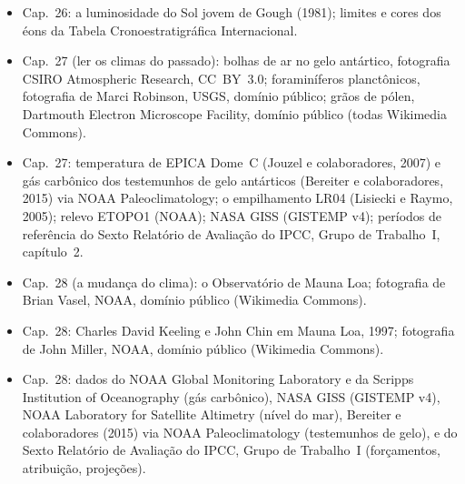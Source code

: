 \begin{itemize}
  \item Cap.~26: a luminosidade do Sol jovem de Gough (1981); limites e cores dos éons da Tabela Cronoestratigráfica Internacional.
  \item Cap.~27 (ler os climas do passado): bolhas de ar no gelo antártico, fotografia CSIRO Atmospheric Research, CC~BY~3.0; foraminíferos planctônicos, fotografia de Marci Robinson, USGS, domínio público; grãos de pólen, Dartmouth Electron Microscope Facility, domínio público (todas Wikimedia Commons).
  \item Cap.~27: temperatura de EPICA Dome~C (Jouzel e colaboradores, 2007) e gás carbônico dos testemunhos de gelo antárticos (Bereiter e colaboradores, 2015) via NOAA Paleoclimatology; o empilhamento LR04 (Lisiecki e Raymo, 2005); relevo ETOPO1 (NOAA); NASA GISS (GISTEMP v4); períodos de referência do Sexto Relatório de Avaliação do IPCC, Grupo de Trabalho~I, capítulo~2.
  \item Cap.~28 (a mudança do clima): o Observatório de Mauna Loa; fotografia de Brian Vasel, NOAA, domínio público (Wikimedia Commons).
  \item Cap.~28: Charles David Keeling e John Chin em Mauna Loa, 1997; fotografia de John Miller, NOAA, domínio público (Wikimedia Commons).
  \item Cap.~28: dados do NOAA Global Monitoring Laboratory e da Scripps Institution of Oceanography (gás carbônico), NASA GISS (GISTEMP v4), NOAA Laboratory for Satellite Altimetry (nível do mar), Bereiter e colaboradores (2015) via NOAA Paleoclimatology (testemunhos de gelo), e do Sexto Relatório de Avaliação do IPCC, Grupo de Trabalho~I (forçamentos, atribuição, projeções).
\end{itemize}
